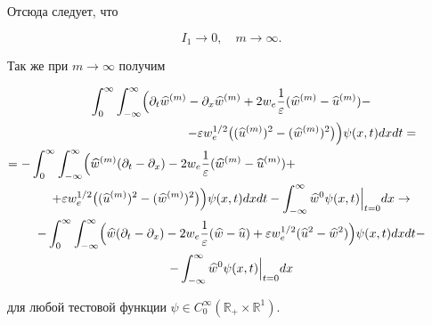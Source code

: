 \pagebreak



\noindent

Отсюда следует, что

$$

I_1\to 0,\quad  m\to \infty.

$$

Так же при $m\to\infty$ получим

\begin{multline*}

\int_0^\infty \int_{-\infty}^\infty 

\Bigl(\pa_t\widehat{w}^{(m)}-\pa_x\widehat{w}^{(m)}+2w_e\frac{1}{\ve}(\widehat{w}^{(m)}-\widehat{u}^{(m)})-

\\

\hspace{4cm}

-\ve w_e^{1/2}\bigl((\widehat{u}^{(m)})^2-(\widehat{w}^{(m)})^2\bigr)\Bigr) \psi(x,t) dxdt=

\\

=-\int_0^\infty \int_{-\infty}^\infty

\Bigl(\widehat{w}^{(m)} (\pa_t-\pa_x)-2w_e\frac{1}{\ve}(\widehat{w}^{(m)}-\widehat{u}^{(m)})+ \hspace{4.5cm}

\\

+\ve w_e^{1/2}

\bigl(

(\widehat{u}^{(m)})^2-(\widehat{w}^{(m)})^2\bigr)\Bigr) 

\psi(x,t) dxdt-

\int_{-\infty}^\infty \widehat{w}^0 \psi(x,t)\Bigr|_{t=0} dx\to

\\

-\int_0^\infty \int_{-\infty}^\infty \Bigl(\widehat{w} (\pa_t-\pa_x)-2w_e\frac{1}{\ve}(\widehat{w}-\widehat{u})+\ve w_e^{1/2}(\widehat{u}^2-\widehat{w}^2)\Bigr) \psi(x,t) dxdt-

\\

-\int_{-\infty}^\infty \widehat{w}^0 \psi(x,t)\Bigr|_{t=0} dx

\end{multline*}

для любой тестовой функции $\psi \in C_0^\infty(\mathbb R_{+}\times \mathbb R^1)$.



